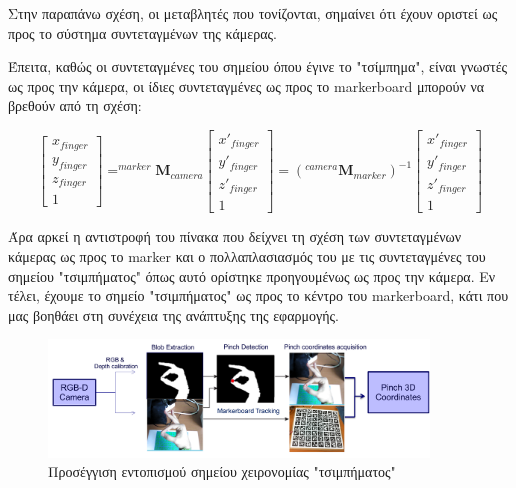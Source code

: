 Στην παραπάνω σχέση, οι μεταβλητές που τονίζονται, σημαίνει ότι έχουν οριστεί ως προς το σύστημα συντεταγμένων της κάμερας.

Έπειτα, καθώς οι συντεταγμένες του σημείου όπου έγινε το "τσίμπημα", είναι γνωστές ως προς την κάμερα, οι ίδιες συντεταγμένες ως προς το markerboard μπορούν να βρεθούν από τη σχέση:


\begin{equation}
\begin{bmatrix}
x_{finger} \\ y_{finger} \\ z_{finger} \\ 1
\end{bmatrix}
=
^{marker}\mathbf{M}_{camera}
\begin{bmatrix}
x'_{finger} \\ y'_{finger} \\ z'_{finger} \\ 1
\end{bmatrix}
=
(^{camera}\mathbf{M}_{marker})^{-1}
\begin{bmatrix}
x'_{finger} \\ y'_{finger} \\ z'_{finger} \\ 1
\end{bmatrix}
\end{equation}


Άρα αρκεί η αντιστροφή του πίνακα που δείχνει τη σχέση των συντεταγμένων κάμερας ως προς το marker και ο πολλαπλασιασμός του με τις συντεταγμένες του σημείου "τσιμπήματος" όπως αυτό ορίστηκε προηγουμένως ως προς την κάμερα. Εν τέλει, έχουμε το σημείο "τσιμπήματος" ως προς το κέντρο του markerboard, κάτι που μας βοηθάει στη συνέχεια της ανάπτυξης της εφαρμογής.


\begin{figure}[H]
    \centering
    \includegraphics[width=0.9\textwidth]{Files/Figures/procedure.png}
    \caption[Προσέγγιση εντοπισμού σημείου χειρονομίας "τσιμπήματος" ]{Προσέγγιση εντοπισμού σημείου χειρονομίας "τσιμπήματος"}
    \label{fig:procedure}
\end{figure}



